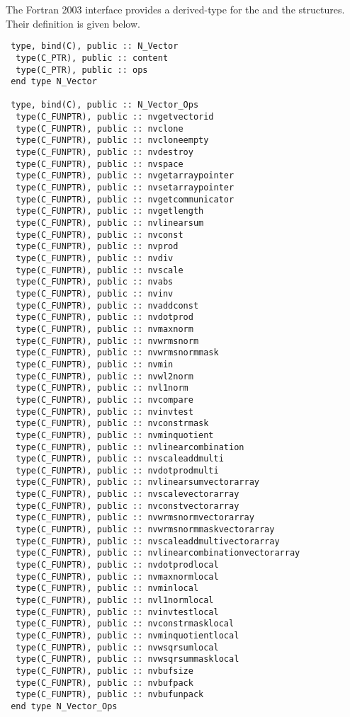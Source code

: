 The Fortran 2003 interface provides a  derived-type for the
 and the  structures.
Their definition is given below.
\begin{verbatim}
 type, bind(C), public :: N_Vector
  type(C_PTR), public :: content
  type(C_PTR), public :: ops
 end type N_Vector

 type, bind(C), public :: N_Vector_Ops
  type(C_FUNPTR), public :: nvgetvectorid
  type(C_FUNPTR), public :: nvclone
  type(C_FUNPTR), public :: nvcloneempty
  type(C_FUNPTR), public :: nvdestroy
  type(C_FUNPTR), public :: nvspace
  type(C_FUNPTR), public :: nvgetarraypointer
  type(C_FUNPTR), public :: nvsetarraypointer
  type(C_FUNPTR), public :: nvgetcommunicator
  type(C_FUNPTR), public :: nvgetlength
  type(C_FUNPTR), public :: nvlinearsum
  type(C_FUNPTR), public :: nvconst
  type(C_FUNPTR), public :: nvprod
  type(C_FUNPTR), public :: nvdiv
  type(C_FUNPTR), public :: nvscale
  type(C_FUNPTR), public :: nvabs
  type(C_FUNPTR), public :: nvinv
  type(C_FUNPTR), public :: nvaddconst
  type(C_FUNPTR), public :: nvdotprod
  type(C_FUNPTR), public :: nvmaxnorm
  type(C_FUNPTR), public :: nvwrmsnorm
  type(C_FUNPTR), public :: nvwrmsnormmask
  type(C_FUNPTR), public :: nvmin
  type(C_FUNPTR), public :: nvwl2norm
  type(C_FUNPTR), public :: nvl1norm
  type(C_FUNPTR), public :: nvcompare
  type(C_FUNPTR), public :: nvinvtest
  type(C_FUNPTR), public :: nvconstrmask
  type(C_FUNPTR), public :: nvminquotient
  type(C_FUNPTR), public :: nvlinearcombination
  type(C_FUNPTR), public :: nvscaleaddmulti
  type(C_FUNPTR), public :: nvdotprodmulti
  type(C_FUNPTR), public :: nvlinearsumvectorarray
  type(C_FUNPTR), public :: nvscalevectorarray
  type(C_FUNPTR), public :: nvconstvectorarray
  type(C_FUNPTR), public :: nvwrmsnormvectorarray
  type(C_FUNPTR), public :: nvwrmsnormmaskvectorarray
  type(C_FUNPTR), public :: nvscaleaddmultivectorarray
  type(C_FUNPTR), public :: nvlinearcombinationvectorarray
  type(C_FUNPTR), public :: nvdotprodlocal
  type(C_FUNPTR), public :: nvmaxnormlocal
  type(C_FUNPTR), public :: nvminlocal
  type(C_FUNPTR), public :: nvl1normlocal
  type(C_FUNPTR), public :: nvinvtestlocal
  type(C_FUNPTR), public :: nvconstrmasklocal
  type(C_FUNPTR), public :: nvminquotientlocal
  type(C_FUNPTR), public :: nvwsqrsumlocal
  type(C_FUNPTR), public :: nvwsqrsummasklocal
  type(C_FUNPTR), public :: nvbufsize
  type(C_FUNPTR), public :: nvbufpack
  type(C_FUNPTR), public :: nvbufunpack
 end type N_Vector_Ops
\end{verbatim}


